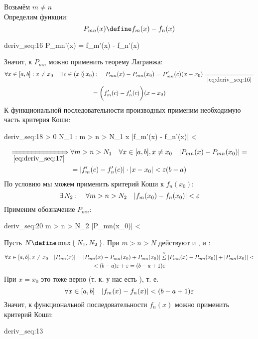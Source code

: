 \begin{iproof}
	\item Возьмём $ m \ne n $ \\
	Определим функции:
	$$ P_{mn}(x) \define f_m(x) - f_n(x) $$
	\begin{equ}{deriv_seq:16}
		 \implies \exist P_{mn}'(x) = f_m'(x) - f_n'(x)
	\end{equ}
	Значит, к $ P_{mn} $ можно применить теорему Лагранжа:
	\begin{multline}\lbl{deriv_seq:17}
		\forall x \in [a, b] : x \ne x_0 \quad \exist c \in (x \between x_0) : \quad P_{mn}(x) - P_{mn}(x_0) = P_{mn}'(c)(x - x_0) \undereq{\eref{deriv_seq:16}} \\
		= \bigg( f_m'(c) - f_n'(c) \bigg)(x - x_0)
	\end{multline}
	К функциональной последовательности производных применим необходимую часть критерия Коши:
	\begin{equ}{deriv_seq:18}
		\forall \veps > 0 \quad \exist N_1 : \quad \forall m > n > N_1 \quad \forall x \in [a, b] \quad |f_m'(x) - f_n'(x)| < \veps
	\end{equ}
	\begin{multline}\lbl{deriv_seq:19}
		\underimp{\eref{deriv_seq:17}} \forall m > n > N_1 \quad \forall x \in [a, b], x \ne x_0 \quad |P_{mn}(x) - P_{mn}(x_0)| = \\
		= |f_m'(c) - f_n'(c)| \cdot |x - x_0| < \veps (b - a)
	\end{multline}
	По условию  мы можем применить критерий Коши к $ f_n(x_0) $:
	$$ \exists\, N_2 : \quad \forall m > n > N_2 \quad |f_m(x_0) - f_n(x_0)| < \varepsilon $$
	Применим обозначение $ P_{mn} $:
	\begin{equ}{deriv_seq:20}
		\forall m > n > N_2 \quad |P_{mn}(x_0)| < \veps
	\end{equ}
	Пусть $ N \define \max\set{N_1, N_2} $. При $ m > n > N $ действуют и , и :
	\begin{multline*}
		\forall x \in [a, b], x \ne x_0 \quad |P_{mn}(x)| = |P_{mn}(x) - P_{mn}(x_0) + P_{mn}(x_0)| \stackrel\vartriangle\le |P_{mn}(x) - P_{mn}(x_0)| + |P_{mn}(x_0)| < \\
		< (b - a)\varepsilon + \varepsilon = (b - a + 1)\varepsilon
	\end{multline*}
	При $ x = x_0 $ это тоже верно (т. к. у нас есть ), т. е.
	$$ \forall x \in [a, b] \quad |f_m(x) - f_n(x)| < (b - a + 1)\varepsilon $$
	Значит, к функциональной последовательности $ f_n(x) $ можно применить критерий Коши:
	\begin{equ}{deriv_seq:13}

\end{equ}
\end{iproof}
